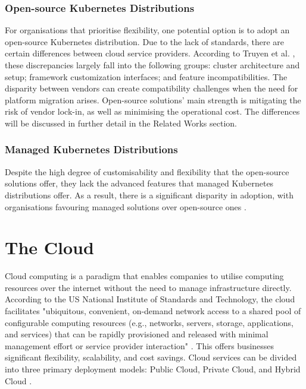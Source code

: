 \subsubsection{Open-source Kubernetes Distributions}

For organisations that prioritise flexibility, one potential option is to adopt an open-source Kubernetes distribution. Due to the lack of standards, there are certain differences between cloud service providers. According to Truyen et al. \cite{truyenManagingFeatureCompatibility2020}, these discrepancies largely fall into the following groups: cluster architecture and setup; framework customization interfaces; and feature incompatibilities. The disparity between vendors can create compatibility challenges when the need for platform migration arises. Open-source solutions' main strength is mitigating the risk of vendor lock-in, as well as minimising the operational cost. The differences will be discussed in further detail in the Related Works section.

\subsubsection{Managed Kubernetes Distributions}

Despite the high degree of customisability and flexibility that the open-source solutions offer, they lack the advanced features that managed Kubernetes distributions offer. As a result, there is a significant disparity in adoption, with organisations favouring managed solutions over open-source ones \cite{redhatinc.StateKubernetesSecurity2024}.


\section{The Cloud}

Cloud computing is a paradigm that enables companies to utilise computing resources over the internet without the need to manage infrastructure directly. According to the US National Institute of Standards and Technology, the cloud facilitates "ubiquitous, convenient, on-demand network access to a shared pool of configurable computing resources (e.g., networks, servers, storage, applications, and services) that can be rapidly provisioned and released with minimal management effort or service provider interaction" \cite{editorCloudComputingGlossary}. This offers businesses significant flexibility, scalability, and cost savings. Cloud services can be divided into three primary deployment models: Public Cloud, Private Cloud, and Hybrid Cloud \cite{jadejaCloudComputingConcepts2012}.

